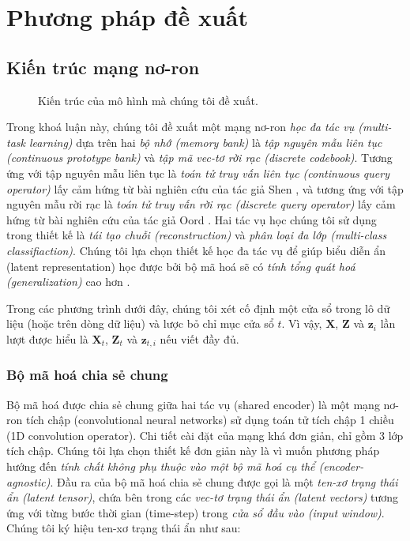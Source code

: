 \chapter{Phương pháp đề xuất}
\label{Chapter3}

\pagebreak
\section{Kiến trúc mạng nơ-ron}
\label{sec:neural-network-architecture}
\begin{figure}[H]
    \centering
    
    \caption{Kiến trúc của mô hình mà chúng tôi đề xuất.}
    \label{fig:architecture-thesis}
\end{figure}

Trong khoá luận này, chúng tôi đề xuất một mạng nơ-ron \textit{học đa tác vụ (multi-task learning)} dựa trên hai \textit{bộ nhớ (memory bank)} là \textit{tập nguyên mẫu liên tục (continuous prototype bank)} và \textit{tập mã vec-tơ rời rạc (discrete codebook)}. Tương ứng với tập nguyên mẫu liên tục là \textit{toán tử truy vấn liên tục (continuous query operator)} lấy cảm hứng từ bài nghiên cứu của tác giả Shen \cite{shen2025learn}, và tương ứng với tập nguyên mẫu rời rạc là \textit{toán tử truy vấn rời rạc (discrete query operator)} lấy cảm hứng từ bài nghiên cứu của tác giả Oord \cite{3295222.3295378}. Hai tác vụ học chúng tôi sử dụng trong thiết kế là \textit{tái tạo chuỗi (reconstruction)} và \textit{phân loại đa lớp (multi-class classifiaction)}. Chúng tôi lựa chọn thiết kế học đa tác vụ để giúp biểu diễn ẩn (latent representation) học được bởi bộ mã hoá sẽ có \textit{tính tổng quát hoá (generalization)} cao hơn \cite{9847099}.

Trong các phương trình dưới đây, chúng tôi xét cố định một cửa sổ trong lô dữ liệu (hoặc trên dòng dữ liệu) và lược bỏ chỉ mục cửa sổ $t$. Vì vậy, $\mathbf{X}$, $\mathbf{Z}$ và $\mathbf{z}_i$ lần lượt được hiểu là $\mathbf{X}_t$, $\mathbf{Z}_t$ và $\mathbf{z}_{t,i}$ nếu viết đầy đủ.

\subsection{Bộ mã hoá chia sẻ chung}
Bộ mã hoá được chia sẻ chung giữa hai tác vụ (shared encoder) là một mạng nơ-ron tích chập (convolutional neural networks) sử dụng toán tử tích chập 1 chiều (1D convolution operator). Chi tiết cài đặt của mạng khá đơn giản, chỉ gồm 3 lớp tích chập. Chúng tôi lựa chọn thiết kế đơn giản này là vì muốn phương pháp hướng đến \textit{tính chất không phụ thuộc vào một bộ mã hoá cụ thể (encoder-agnostic)}. Đầu ra của bộ mã hoá chia sẻ chung được gọi là một \textit{ten-xơ trạng thái ẩn (latent tensor)}, chứa bên trong các \textit{vec-tơ trạng thái ẩn (latent vectors)} tương ứng với từng bước thời gian (time-step) trong \textit{cửa sổ đầu vào (input window)}. Chúng tôi ký hiệu ten-xơ trạng thái ẩn như sau:

